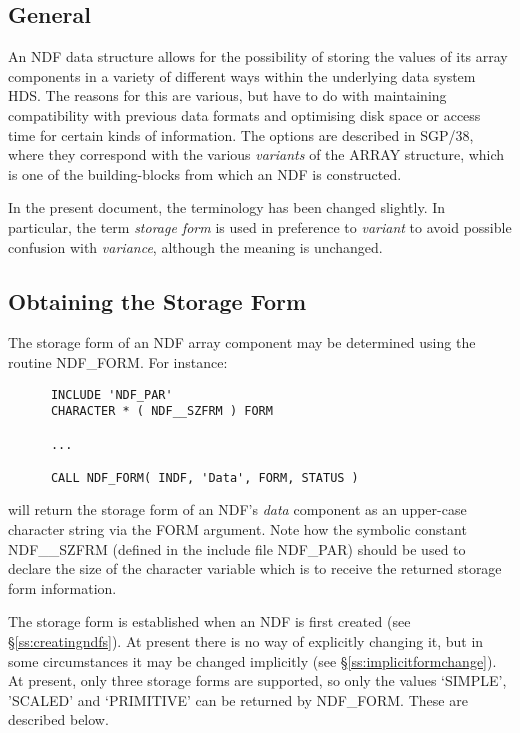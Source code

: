 \documentclass[twoside,11pt]{article}
\newcommand{\htmlref}[2]{#1}
\newcommand{\xref}[3]{#1}
\newcommand{\xlabel}[1]{}
\newcommand{\st}[1]{{\em{#1}}}
\begin{document}
\subsection{\xlabel{general_storage_form}General}

An NDF data structure allows for the possibility of storing the values of 
its array components in a variety of different ways within the underlying 
data system \xref{HDS}{sun92}{}.
The reasons for this are various, but have to do with maintaining
compatibility with previous data formats and optimising disk space or access
time for certain kinds of information.
The options are described in \xref{SGP/38}{sgp38}{}, where they
correspond with the various
\st{variants\/} of the \xref{ARRAY}{sun11}{} structure, which is one
of the building-blocks from which an NDF is constructed. 

In the present document, the terminology has been changed slightly.
In particular, the term \st{storage form\/} is used in preference to
\st{variant\/} to avoid possible confusion with \st{variance},
although the meaning is unchanged.

\subsection{\xlabel{obtaining_the_storage_form}Obtaining the Storage Form}

The storage form of an NDF array component may be determined using the 
routine \htmlref{NDF\_FORM}{NDF_FORM}.
For instance:

\small
\begin{verbatim}
      INCLUDE 'NDF_PAR'
      CHARACTER * ( NDF__SZFRM ) FORM

      ...

      CALL NDF_FORM( INDF, 'Data', FORM, STATUS )
\end{verbatim}
\normalsize

will return the storage form of an NDF's \st{data\/} component as an
upper-case character string via the FORM argument.
Note how the symbolic constant NDF\_\_SZFRM (defined in the include file 
NDF\_PAR) should be used to declare the size of the character variable which 
is to receive the returned storage form information.

The storage form is established when an NDF is first created (see
\S\ref{ss:creatingndfs}).
At present there is no way of explicitly changing it, but in some
circumstances it may be changed implicitly (see
\S\ref{ss:implicitformchange}). 
At present, only three storage forms are supported, so only the values
`SIMPLE', 'SCALED' and `PRIMITIVE' can be returned by NDF\_FORM. 
These are described below.
\end{document}
